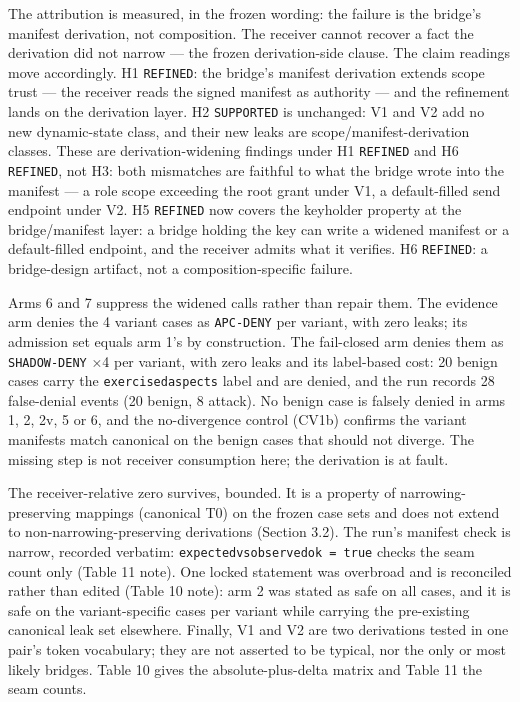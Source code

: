 \documentclass[
  10pt,
]{article}
\let\origtexttt\texttt
\renewcommand{\texttt}[1]{{\upshape\origtexttt{#1}}}
\renewcommand{\_}{\allowbreak\origunderscore}
\begin{document}
The attribution is measured, in the frozen wording: the failure is the
bridge's manifest derivation, not composition. The receiver cannot
recover a fact the derivation did not narrow --- the frozen
derivation-side clause. The claim readings move accordingly. H1
\texttt{REFINED}: the bridge's manifest derivation extends scope trust
--- the receiver reads the signed manifest as authority --- and the
refinement lands on the derivation layer. H2 \texttt{SUPPORTED} is
unchanged: V1 and V2 add no new dynamic-state class, and their new leaks
are scope/manifest-derivation classes. These are derivation-widening
findings under H1 \texttt{REFINED} and H6 \texttt{REFINED}, not H3: both
mismatches are faithful to what the bridge wrote into the manifest --- a
role scope exceeding the root grant under V1, a default-filled send
endpoint under V2. H5 \texttt{REFINED} now covers the keyholder property
at the bridge/manifest layer: a bridge holding the key can write a
widened manifest or a default-filled endpoint, and the receiver admits
what it verifies. H6 \texttt{REFINED}: a bridge-design artifact, not a
composition-specific failure.

Arms 6 and 7 suppress the widened calls rather than repair them. The
evidence arm denies the 4 variant cases as \texttt{APC-DENY} per
variant, with zero leaks; its admission set equals arm 1's by
construction. The fail-closed arm denies them as \texttt{SHADOW-DENY} ×4
per variant, with zero leaks and its label-based cost: 20 benign cases
carry the \texttt{exercised\_aspects} label and are denied, and the run
records 28 false-denial events (20 benign, 8 attack). No benign case is
falsely denied in arms 1, 2, 2v, 5 or 6, and the no-divergence control
(CV1b) confirms the variant manifests match canonical on the benign
cases that should not diverge. The missing step is not receiver
consumption here; the derivation is at fault.

The receiver-relative zero survives, bounded. It is a property of
narrowing-preserving mappings (canonical T0) on the frozen case sets and
does not extend to non-narrowing-preserving derivations (Section 3.2).
The run's manifest check is narrow, recorded verbatim:
\texttt{expected\_vs\_observed\_ok\ =\ true} checks the seam count only
(Table 11 note). One locked statement was overbroad and is reconciled
rather than edited (Table 10 note): arm 2 was stated as safe on all
cases, and it is safe on the variant-specific cases per variant while
carrying the pre-existing canonical leak set elsewhere. Finally, V1 and
V2 are two derivations tested in one pair's token vocabulary; they are
not asserted to be typical, nor the only or most likely bridges. Table
10 gives the absolute-plus-delta matrix and Table 11 the seam counts.
\end{document}
